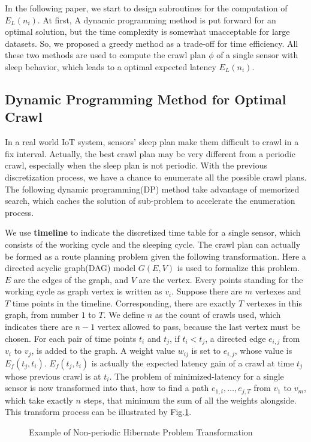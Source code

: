 \documentclass[conference]{IEEEtran}
\begin{document}
In the following paper, we start to design subroutines for the computation of $E_L(n_i)$.
At first, A dynamic programming method is put forward for an optimal solution,  but the time complexity is somewhat unacceptable for large datasets.
So, we proposed a greedy method as a trade-off for time efficiency. 
All these two methods are used to compute the crawl plan $\phi$ of a single sensor with sleep behavior, which leads to a optimal expected latency $E_L(n_i)$.

\subsection{Dynamic Programming Method for Optimal Crawl}

In a real world IoT system, sensors' sleep plan make them difficult to crawl in a fix interval. 
Actually, the best crawl plan may be very different from a periodic crawl, especially when the sleep plan is not periodic.
With the previous discretization process, we have a chance to enumerate all the possible crawl plans. 
The following dynamic programming(DP) method take advantage of memorized search, which caches the solution of sub-problem to accelerate the enumeration process.

We use \textbf{timeline} to indicate the discretized time table for a single sensor, which consists of the working cycle and the sleeping cycle.
The crawl plan can actually be formed as a route planning problem given the following transformation.
Here a directed acyclic graph(DAG) model $G(E,V)$ is used to formalize this problem.
$E$ are the edges of the graph, and $V$ are the vertex. 
Every points standing for the working cycle as graph vertex is written as $v_i$. 
Suppose there are $m$ vertexes and $T$ time points in the timeline. 
Corresponding, there are exactly $T$ vertexes in this graph, from number $1$ to $T$. 
We define $n$ as the count of crawls used, which indicates there are $n-1$ vertex allowed to pass, because the last vertex must be chosen. 
For each pair of time points $t_i$ and $t_j$, if $t_i<t_j$, a directed edge $e_{i,j}$ from $v_i$ to $v_j$, is added to the graph. 
A weight value $w_{ij}$ is set to $e_{i,j}$, whose value is $E_f(t_j, t_i)$.
$E_f(t_j, t_i)$ is actually the expected latency gain of a crawl at time $t_j$ whose previous crawl is at $t_i$.
The problem of minimized-latency for a single sensor is now transformed into that, how to find a path $e_{1,i},\ldots,e_{j,T}$ from $v_1$ to $v_m$, which take exactly $n$ steps, that minimum the sum of all the weights alongside. 
This transform process can be illustrated by Fig.\ref{fig:problemtrans}.
\begin{figure}
	\centering
	
	\captionsetup{justification=centering}
	\caption{Example of Non-periodic Hibernate Problem Transformation}
	\vspace{-1.5em}
	\label{fig:problemtrans}
\end{figure}
\end{document}

